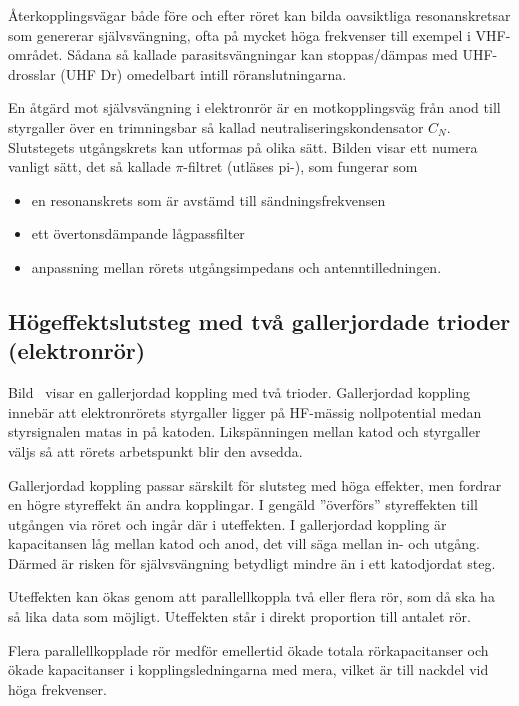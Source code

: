 Återkopplingsvägar både före och efter röret kan bilda oavsiktliga
resonanskretsar som genererar självsvängning, ofta på mycket höga
frekvenser till exempel i VHF-området.
Sådana så kallade parasitsvängningar kan stoppas/dämpas med UHF-drosslar (UHF
Dr) omedelbart intill röranslutningarna.

En åtgärd mot självsvängning i elektronrör är en motkopplingsväg från anod till
styrgaller över en trimningsbar så kallad neutraliseringskondensator \(C_N\).
Slutstegets utgångskrets kan utformas på olika sätt.
Bilden visar ett numera vanligt sätt, det så kallade \(\pi\)-filtret (utläses
pi-), som fungerar som
\begin{itemize}
  \item en resonanskrets som är avstämd till sändningsfrekvensen
  \item ett övertonsdämpande lågpassfilter
  \item anpassning mellan rörets utgångsimpedans och antenntilledningen.
\end{itemize}

\subsection{Högeffektslutsteg med två gallerjordade trioder (elektronrör)}


Bild~ visar en gallerjordad koppling med två trioder.
Gallerjordad koppling innebär att elektronrörets styrgaller ligger på
HF-mässig nollpotential medan styrsignalen matas in på katoden.
Likspänningen mellan katod och styrgaller väljs så att rörets arbetspunkt blir
den avsedda.

Gallerjordad koppling passar särskilt för slutsteg med höga effekter,
men fordrar en högre styreffekt än andra kopplingar.
I gengäld ''överförs'' styreffekten till utgången via röret och ingår där i
uteffekten.
I gallerjordad koppling är kapacitansen låg mellan katod och anod, det vill
säga mellan in- och utgång.
Därmed är risken för självsvängning betydligt mindre än i ett katodjordat steg.

Uteffekten kan ökas genom att parallellkoppla två eller flera rör, som då ska
ha så lika data som möjligt.
Uteffekten står i direkt proportion till antalet rör.

Flera parallellkopplade rör medför emellertid ökade totala rörkapacitanser och 
ökade kapacitanser i kopplingsledningarna med mera, vilket är till nackdel vid
höga frekvenser.

